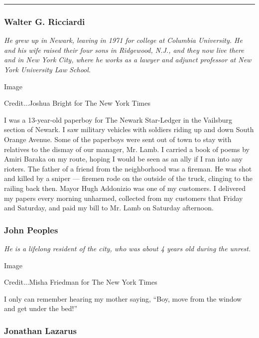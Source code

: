 \begin{center}\rule{0.5\linewidth}{\linethickness}\end{center}

\hypertarget{walter-g-ricciardi}{%
\subsubsection{Walter G. Ricciardi}\label{walter-g-ricciardi}}

\emph{He grew up in Newark, leaving in 1971 for college at Columbia
University. He and his wife raised their four sons in Ridgewood, N.J.,
and they now live there and in New York City, where he works as a lawyer
and adjunct professor at New York University Law School.}

Image

Credit...Joshua Bright for The New York Times

I was a 13-year-old paperboy for The Newark Star-Ledger in the Vailsburg
section of Newark. I saw military vehicles with soldiers riding up and
down South Orange Avenue. Some of the paperboys were sent out of town to
stay with relatives to the dismay of our manager, Mr. Lamb. I carried a
book of poems by Amiri Baraka on my route, hoping I would be seen as an
ally if I ran into any rioters. The father of a friend from the
neighborhood was a fireman. He was shot and killed by a sniper ---
firemen rode on the outside of the truck, clinging to the railing back
then. Mayor Hugh Addonizio was one of my customers. I delivered my
papers every morning unharmed, collected from my customers that Friday
and Saturday, and paid my bill to Mr. Lamb on Saturday afternoon. ~

\hypertarget{john-peoples}{%
\subsubsection{John Peoples}\label{john-peoples}}

\emph{He is a lifelong resident of the city, who was about 4 years old
during the unrest.}

Image

Credit...Misha Friedman for The New York Times

I only can remember hearing my mother saying, ``Boy, move from the
window and get under the bed!''

\hypertarget{jonathan-lazarus}{%
\subsubsection{Jonathan Lazarus}\label{jonathan-lazarus}}

